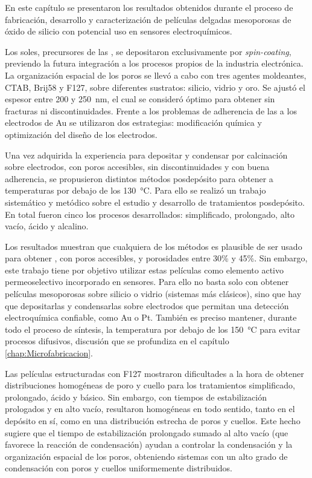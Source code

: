 	En este capítulo se presentaron los resultados obtenidos durante el proceso de fabricación, desarrollo y caracterización de películas delgadas mesoporosas de óxido de silicio con potencial uso en sensores electroquímicos.
	
	Los soles, precursores de las \pdm, se depositaron exclusivamente por \textit{spin-coating}, previendo la futura integración a los procesos propios de la industria electrónica. La organización espacial de los poros se llevó a cabo con tres agentes moldeantes, CTAB, Brij58 y F127, sobre diferentes sustratos: silicio, vidrio y oro. Se ajustó el espesor entre 200 y \SI{250}{\nm}, el cual se consideró óptimo para obtener \pdm\space sin fracturas ni discontinuidades. Frente a los problemas de adherencia de las \pdm\space a los electrodos de Au se utilizaron dos estrategias: modificación química y optimización del diseño de los electrodos. 

	Una vez adquirida la experiencia para depositar y condensar por calcinación \pdm\space sobre electrodos, con poros accesibles, sin discontinuidades y con buena adherencia, se propusieron distintos métodos posdepósito para obtener \pdm\space a temperaturas por debajo de los \SI{130}{\celsius}. Para ello se realizó un trabajo sistemático y metódico sobre el estudio y desarrollo de tratamientos posdepósito. En total fueron cinco los procesos desarrollados: simplificado, prolongado, alto vacío, ácido y alcalino.

	Los resultados muestran que cualquiera de los métodos es plausible de ser usado para obtener \pdm, con poros accesibles, y porosidades entre 30\% y 45\%. Sin embargo, este trabajo tiene por objetivo utilizar estas películas como elemento activo permeoselectivo incorporado en sensores. Para ello no basta solo con obtener películas mesoporosas sobre silicio o vidrio (sistemas más clásicos), sino que hay que depositarlas y condensarlas sobre electrodos que permitan una detección electroquímica confiable, como Au o Pt. También es preciso mantener, durante todo el proceso de síntesis, la temperatura por debajo de los \SI{150}{\celsius} para evitar procesos difusivos, discusión que se profundiza en el capítulo \ref{chap:Microfabricacion}.

	Las películas estructuradas con F127 mostraron dificultades a la hora de obtener distribuciones homogéneas de poro y cuello para los tratamientos simplificado, prolongado, ácido y básico. Sin embargo, con tiempos de estabilización prologados y en alto vacío, resultaron homogéneas en todo sentido, tanto en el depósito en sí, como en una distribución estrecha de poros y cuellos. Este hecho sugiere que el tiempo de estabilización prolongado sumado al alto vacío (que favorece la reacción de condensación) ayudan a controlar la condensación y la organización espacial de los poros, obteniendo sistemas con un alto grado de condensación con poros y cuellos uniformemente distribuidos.

